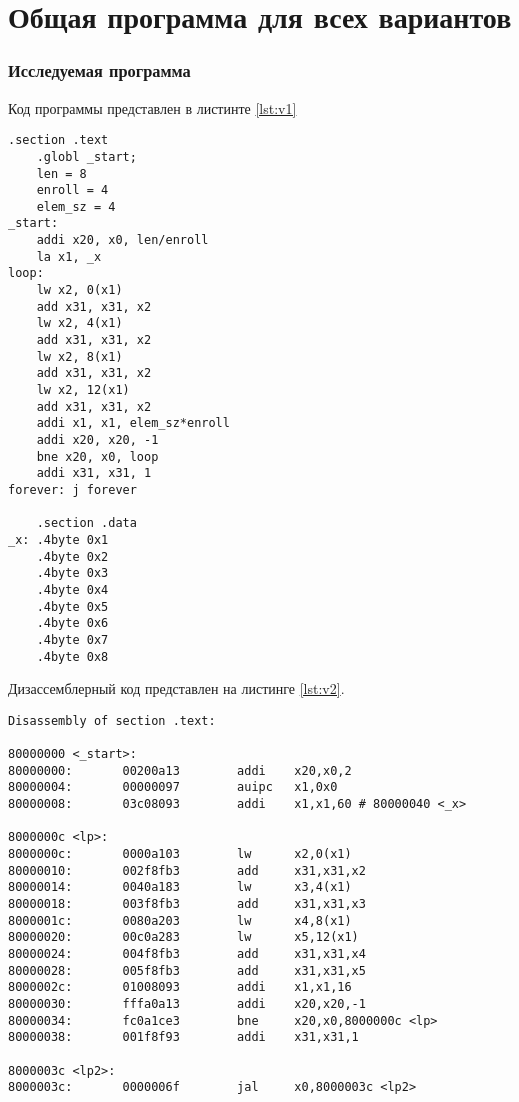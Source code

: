 \chapter*{Общая программа для всех вариантов}

\subsection*{Исследуемая программа}

Код программы представлен в листинте \ref{lst:v1}


\begin{lstlisting}[label=lst:v1,caption=Код программы для всех вариантов]
	.section .text
	.globl _start;
	len = 8 
	enroll = 4 
	elem_sz = 4 
_start:
	addi x20, x0, len/enroll
	la x1, _x
loop:	
	lw x2, 0(x1)
	add x31, x31, x2
	lw x2, 4(x1)
	add x31, x31, x2
	lw x2, 8(x1)
	add x31, x31, x2
	lw x2, 12(x1)
	add x31, x31, x2
	addi x1, x1, elem_sz*enroll
	addi x20, x20, -1
	bne x20, x0, loop
	addi x31, x31, 1
forever: j forever
	
	.section .data
_x:	.4byte 0x1
	.4byte 0x2
	.4byte 0x3
	.4byte 0x4
	.4byte 0x5
	.4byte 0x6
	.4byte 0x7
	.4byte 0x8
\end{lstlisting}


Дизассемблерный код представлен на листинге \ref{lst:v2}.

\begin{lstlisting}[label=lst:v2,caption=Дизассемблированный код общей программы]
Disassembly of section .text:

80000000 <_start>:
80000000:       00200a13        addi    x20,x0,2
80000004:       00000097        auipc   x1,0x0
80000008:       03c08093        addi    x1,x1,60 # 80000040 <_x>

8000000c <lp>:
8000000c:       0000a103        lw      x2,0(x1)
80000010:       002f8fb3        add     x31,x31,x2
80000014:       0040a183        lw      x3,4(x1)
80000018:       003f8fb3        add     x31,x31,x3
8000001c:       0080a203        lw      x4,8(x1)
80000020:       00c0a283        lw      x5,12(x1)
80000024:       004f8fb3        add     x31,x31,x4
80000028:       005f8fb3        add     x31,x31,x5
8000002c:       01008093        addi    x1,x1,16
80000030:       fffa0a13        addi    x20,x20,-1
80000034:       fc0a1ce3        bne     x20,x0,8000000c <lp>
80000038:       001f8f93        addi    x31,x31,1

8000003c <lp2>:
8000003c:       0000006f        jal     x0,8000003c <lp2>
\end{lstlisting}

